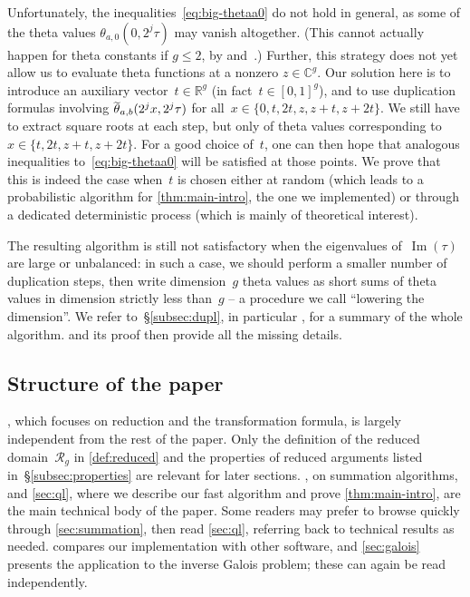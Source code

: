 \documentclass[12pt,oneside]{amsart}
\numberwithin{equation}{section}
\theoremstyle{definition}
\newcommand{\R}{\mathbb{R}}
\newcommand{\red}{\mathcal{R}}
\newcommand{\C}{\mathbb{C}}
\DeclareMathOperator{\im}{Im}
\DeclareMathOperator{\thetatilde}{\rlap{\raisebox{-0.1ex}{$\widetilde{\phantom{\,t}}$}}\theta}
\begin{document}
Unfortunately, the inequalities~\eqref{eq:big-thetaa0} do not hold in general,
as some of the theta values $\theta_{a,0}(0, 2^j\tau)$ may vanish
altogether. (This cannot actually happen for theta constants if $g\leq 2$, by
\cite[Lem.~2.9]{coxArithmeticgeometricMeanGauss1984}
and~\cite[Cor.~7.7]{strengComputingIgusaClass2014}.) Further, this strategy
does not yet allow us to evaluate theta functions at a nonzero $z\in \C^g$. Our
solution here is to introduce an auxiliary vector~$t\in \R^g$ (in
fact~$t\in [0,1]^g$), and to use duplication formulas involving
$\thetatilde_{a,b}(2^jx, 2^j\tau)$ for all~$x\in \{0,t,2t, z,z+t,z+2t\}$. We
still have to extract square roots at each step, but only of theta values
corresponding to~$x\in \{t, 2t, z+t, z+2t\}$. For a good choice of~$t$, one can
then hope that analogous inequalities to~\eqref{eq:big-thetaa0} will be
satisfied at those points. We prove that this is indeed the case when~$t$ is
chosen either at random (which leads to a probabilistic algorithm for
\cref{thm:main-intro}, the one we implemented) or through a dedicated
deterministic process (which is mainly of theoretical interest).

The resulting algorithm is still not satisfactory when the eigenvalues
of~$\im(\tau)$ are large or unbalanced: in such a case, we should perform a
smaller number of duplication steps, then write dimension~$g$ theta values as
short sums of theta values in dimension strictly less than~$g$ -- a procedure
we call ``lowering the dimension''. We refer to~§\ref{subsec:dupl}, in
particular , for a summary of the whole algorithm.
 and its proof then provide all the missing details.

\subsection{Structure of the paper}
\label{subsec:structure}

, which focuses on reduction and the transformation
formula, is largely independent from the rest of the paper. Only the definition
of the reduced domain~$\red_g$ in \cref{def:reduced} and the properties of
reduced arguments listed in~§\ref{subsec:properties} are relevant for later
sections. , on summation algorithms, and \cref{sec:ql},
where we describe our fast algorithm and prove \cref{thm:main-intro}, are the
main technical body of the paper. Some readers may prefer to browse quickly
through \cref{sec:summation}, then read \cref{sec:ql}, referring back to
technical results as needed.  compares our implementation with
other software, and \cref{sec:galois} presents the application to the inverse
Galois problem; these can again be read independently.
\end{document}
